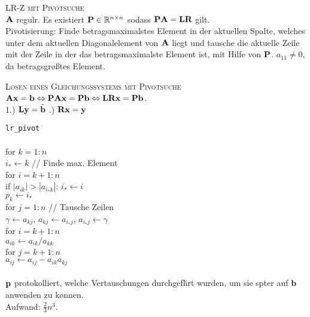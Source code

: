 \textsc{LR-Z mit Pivotsuche}\\
$\mbox{\bf A}$ regul\a r. Es existiert $\mbox{\bf P} \in \mathbb{R}^{n \times n}$ sodass $\mbox{\bf P}\mbox{\bf A}=\mbox{\bf L}\mbox{\bf R}$ gilt. \\
Pivotisierung: Finde betragsmaximalstes Element in der aktuellen Spalte, welches unter dem aktuellen Diagonalelement von $\mbox{\bf A}$ liegt und tausche die aktuelle Zeile mit der Zeile in der das betragsmaximalste Element ist, mit Hilfe von $\mbox{\bf P}$. $a_{11} \neq 0$, da betragsgr\o \ss tes Element.\vspace{0.2cm}

\textsc{L\o sen eines Gleichungssystems mit Pivotsuche}\\
$\mbox{\bf A}\mbox{\bf x} = \mbox{\bf b} \Leftrightarrow \mbox{\bf P}\mbox{\bf A}\mbox{\bf x} = \mbox{\bf P}\mbox{\bf b} \Leftrightarrow \mbox{\bf L}\mbox{\bf R}\mbox{\bf x}=\mbox{\bf P}\mbox{\bf b}$.\\
1.) $\mbox{\bf Ly}=\tilde{\mbox{\bf b}}$ .) $\mbox{\bf Rx} = \mbox{\bf y}$

\verb!lr_pivot!\\
{\addtolength{\leftskip}{0mm}
\hrulefill\\
for $k=1:n$\\
\quad $i_* \leftarrow k$ \qquad\qquad // Finde max. Element \\ 
\quad for $i=k+1:n$ \\ 
\qquad if $|a_{ik}| > |a_{i_*k}|$: $i_* \leftarrow i$ \\
\quad $p_k \leftarrow i_*$ \\
\quad for $j=1:n$ \qquad // Tausche Zeilen \\ 
\qquad $\gamma \leftarrow a_{kj}$, $a_{kj} \leftarrow a_{i_*j}$, $a_{i_*j} \leftarrow \gamma$\\
\quad for $i=k+1:n$ \\ 
\qquad $a_{ik} \leftarrow a_{ik}/a_{kk}$ \\
\qquad for $j=k+1:n$\\
\qquad\quad $a_{ij} \leftarrow a_{ij}-a_{ik}a_{kj}$\\
\hrulefill\\
}
$\mbox{\bf p}$ protokolliert, welche Vertauschungen durchgef\u hrt wurden, um sie sp\a ter auf $\mbox{\bf b}$ anwenden zu k\o nnen.\\
Aufwand: $\frac{2}{3}n^3$.\vspace{0.2cm}


